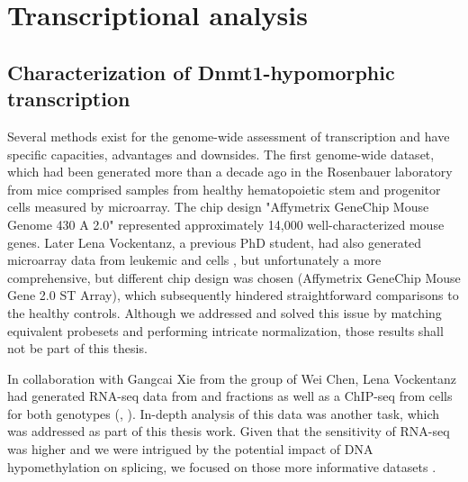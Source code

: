 \chapter{Transcriptional analysis}
\label{chap:r:transcription}
\minitoc

\section{Characterization of Dnmt1-hypomorphic transcription}
\label{chap:r:transcription:intro}

Several methods exist for the genome-wide assessment of transcription and have specific capacities, advantages and downsides. The first genome-wide dataset, which had been generated more than a decade ago in the Rosenbauer laboratory from \dnmtchip mice comprised samples from healthy hematopoietic stem and progenitor cells\cite{Broeske2009,Vockentanz2010} measured by microarray. The chip design "Affymetrix GeneChip Mouse Genome 430 A 2.0" represented approximately 14,000 well-characterized mouse genes. Later Lena Vockentanz, a previous PhD student, had also generated microarray data from leukemic \kitlow and \kithi \mllafnine cells , but unfortunately a more comprehensive, but different chip design was chosen (Affymetrix GeneChip Mouse Gene 2.0 ST Array), which subsequently hindered straightforward comparisons to the healthy controls. Although we addressed and solved this issue by matching equivalent probesets and performing intricate normalization, those results shall not be part of this thesis. 

In collaboration with Gangcai Xie from the group of Wei Chen, Lena Vockentanz had generated RNA-seq data from \mllafnine \kithi and \kitlow fractions\cite{Krivtsov2006,Somervaille2006} as well as a \hisfourthree ChIP-seq from \kithi cells for both genotypes (\dnmtchip, \dnmtwt). In-depth analysis of this data was another task, which was addressed as part of this thesis work. Given that the sensitivity of RNA-seq was higher and we were intrigued by the potential impact of DNA hypomethylation on splicing, we focused on those more informative datasets . 

